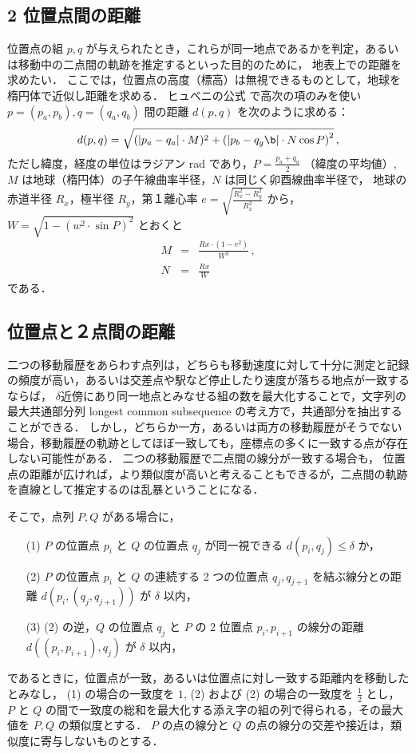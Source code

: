 \documentclass[11pt]{jarticle}
\begin{document}
\subsection{2 位置点間の距離}
位置点の組 $p, q$ が与えられたとき，これらが同一地点であるかを判定，あるいは移動中の二点間の軌跡を推定するといった目的のために，
地表上での距離を求めたい．
ここでは，位置点の高度（標高）は無視できるものとして，地球を楕円体で近似し距離を求める．
ヒュベニの公式 \cite{amano-tec,GSI,Hubeny-formula-ref1,Hubeny-formula-ref2} で高次の項のみを使い $p=(p_a, p_b), q=(q_a, q_b)$ 間の距離 $d(p,q)$ を次のように求める：
\[
d(p,q) = \sqrt{(|p_a - q_a|\cdot M)^2 + \left(|p_b - q_g\b|\cdot N\cos{P} \right)^2} \,,
\]
ただし緯度，経度の単位はラジアン rad であり，$P = \frac{p_a+q_a}{2}$ （緯度の平均値）, $M$ は地球（楕円体）の子午線曲率半径，$N$ は同じく卯酉線曲率半径で，
地球の赤道半径 $R_x$，極半径 $R_y$，第１離心率 $e=\sqrt{\frac{R_x^2 - R_y^2}{R_x^2}}$ から，$W = \sqrt{1 - (w^2 \cdot \sin P)^2}$ とおくと
\begin{eqnarray*}
M &=& \frac{Rx\cdot (1 - e^2)}{W^3} \,, \\
N &=& \frac{Rx}{W}
\end{eqnarray*}
である．

\subsection{位置点と２点間の距離}

二つの移動履歴をあらわす点列は，どちらも移動速度に対して十分に測定と記録の頻度が高い，あるいは交差点や駅など停止したり速度が落ちる地点が一致するならば，
$\delta$近傍にあり同一地点とみなせる組の数を最大化することで，文字列の最大共通部分列 longest common subsequence の考え方で，共通部分を抽出することができる．
しかし，どちらか一方，あるいは両方の移動履歴がそうでない場合，移動履歴の軌跡としてほぼ一致しても，座標点の多くに一致する点が存在しない可能性がある．
二つの移動履歴で二点間の線分が一致する場合も，
位置点の距離が広ければ，より類似度が高いと考えることもできるが，二点間の軌跡を直線として推定するのは乱暴ということになる．

そこで，点列 $P, Q$ がある場合に，
\begin{itemize}
\item[(1)] $P$ の位置点 $p_i$ と $Q$ の位置点 $q_j$ が同一視できる $d(p_i, q_j) \leq \delta$ か，
\item[(2)] $P$ の位置点 $p_i$ と $Q$ の連続する 2 つの位置点 $q_j, q_{j+1}$ を結ぶ線分との距離 $d(p_i, (q_j, q_{j+1}))$ が $\delta$ 以内，
\item[(3)] (2) の逆，$Q$ の位置点 $q_j$ と $P$ の 2 位置点 $p_i, p_{i+1}$ の線分の距離 $d((p_i, p_{i+1}), q_j)$ が $\delta$ 以内，
\end{itemize}
であるときに，位置点が一致，あるいは位置点に対し一致する距離内を移動したとみなし，
(1) の場合の一致度を $1$, (2) および (2) の場合の一致度を $\frac{1}{2}$ とし，
$P$ と $Q$ の間で一致度の総和を最大化する添え字の組の列で得られる，その最大値を $P, Q$ の類似度とする．
$P$ の点の線分と $Q$ の点の線分の交差や接近は，類似度に寄与しないものとする．
\end{document}
